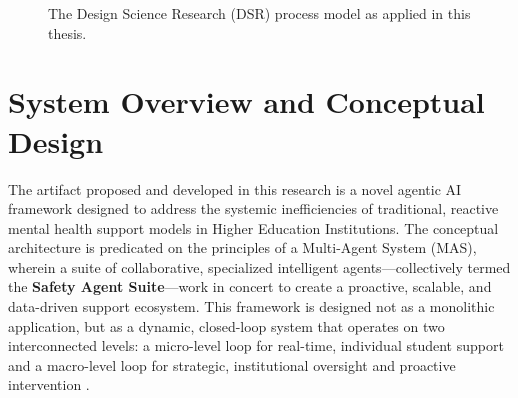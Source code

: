 \begin{figure}[h]
	\centering
	\caption{The Design Science Research (DSR) process model as applied in this thesis.}
	\label{fig:dsr_flowchart}
\end{figure}


\section{System Overview and Conceptual Design}

The artifact proposed and developed in this research is a novel agentic AI framework designed to address the systemic inefficiencies of traditional, reactive mental health support models in Higher Education Institutions. The conceptual architecture is predicated on the principles of a Multi-Agent System (MAS), wherein a suite of collaborative, specialized intelligent agents—collectively termed the \textbf{Safety Agent Suite}—work in concert to create a proactive, scalable, and data-driven support ecosystem. This framework is designed not as a monolithic application, but as a dynamic, closed-loop system that operates on two interconnected levels: a micro-level loop for real-time, individual student support and a macro-level loop for strategic, institutional oversight and proactive intervention \cite{kashiv2025aidrivennetworks, nwoke2025insightautomation}.

